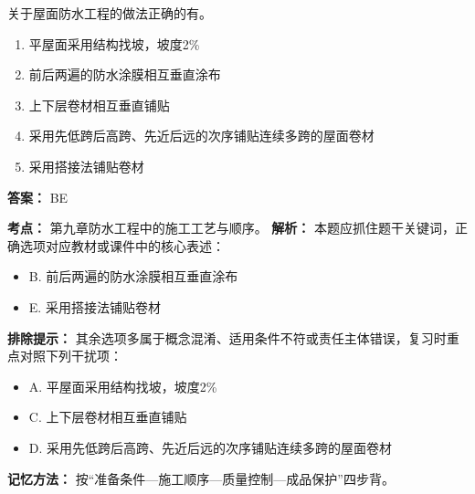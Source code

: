 \documentclass[UTF8,fontset=fandol,11pt]{ctexart}
\begin{document}
\begin{quizbox}[title={第 3 题}]
关于屋面防水工程的做法正确的有。\\
\begin{enumerate}[label=\Alph*.]
\item 平屋面采用结构找坡，坡度2\%
\item 前后两遍的防水涂膜相互垂直涂布
\item 上下层卷材相互垂直铺贴
\item 采用先低跨后高跨、先近后远的次序铺贴连续多跨的屋面卷材
\item 采用搭接法铺贴卷材
\end{enumerate}
\textbf{答案：} BE
\vspace{0.25em}
\begin{answerbox}[title={考点解析}]
\textbf{考点：} 第九章防水工程中的施工工艺与顺序。
\textbf{解析：} 本题应抓住题干关键词，正确选项对应教材或课件中的核心表述：
\begin{itemize}
\item B. 前后两遍的防水涂膜相互垂直涂布
\item E. 采用搭接法铺贴卷材
\end{itemize}
\textbf{排除提示：} 其余选项多属于概念混淆、适用条件不符或责任主体错误，复习时重点对照下列干扰项：
\begin{itemize}
\item A. 平屋面采用结构找坡，坡度2\%
\item C. 上下层卷材相互垂直铺贴
\item D. 采用先低跨后高跨、先近后远的次序铺贴连续多跨的屋面卷材
\end{itemize}
\textbf{记忆方法：} 按“准备条件—施工顺序—质量控制—成品保护”四步背。
\end{answerbox}
\end{quizbox}
\end{document}
